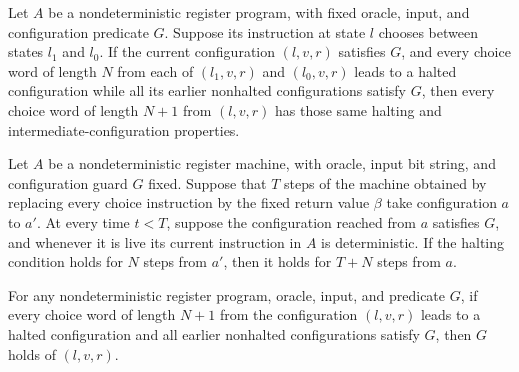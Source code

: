 \begin{lemma}
\label{Complexity.LogProg.NHalts.choose}
\leanok
{}
Let $A$ be a nondeterministic register program, with fixed oracle, input, and
configuration predicate $G$. Suppose its instruction at state $l$ chooses between states
$l_1$ and $l_0$. If the current configuration $(l,v,r)$ satisfies $G$, and every choice
word of length $N$ from each of $(l_1,v,r)$ and $(l_0,v,r)$ leads to a halted
configuration while all its earlier nonhalted configurations satisfy $G$, then every
choice word of length $N+1$ from $(l,v,r)$ has those same halting and
intermediate-configuration properties.
\end{lemma}

\begin{lemma}
\label{Complexity.LogProg.NHalts.run}
\leanok
{}
Let $A$ be a nondeterministic register machine, with oracle, input bit string, and
configuration guard $G$ fixed. Suppose that $T$ steps of the machine obtained by
replacing every choice instruction by the fixed return value $\beta$ take configuration
$a$ to $a'$. At every time $t<T$, suppose the configuration reached from $a$ satisfies
$G$, and whenever it is live its current instruction in $A$ is deterministic. If the
halting condition holds for $N$ steps from $a'$, then it holds for $T+N$ steps from $a$.
\end{lemma}

\begin{lemma}
\label{Complexity.LogProg.NHalts.guard}
\leanok
{}
For any nondeterministic register program, oracle, input, and predicate $G$, if every
choice word of length $N+1$ from the configuration $(l,v,r)$ leads to a halted
configuration and all earlier nonhalted configurations satisfy $G$, then $G$ holds of
$(l,v,r)$.
\end{lemma}

